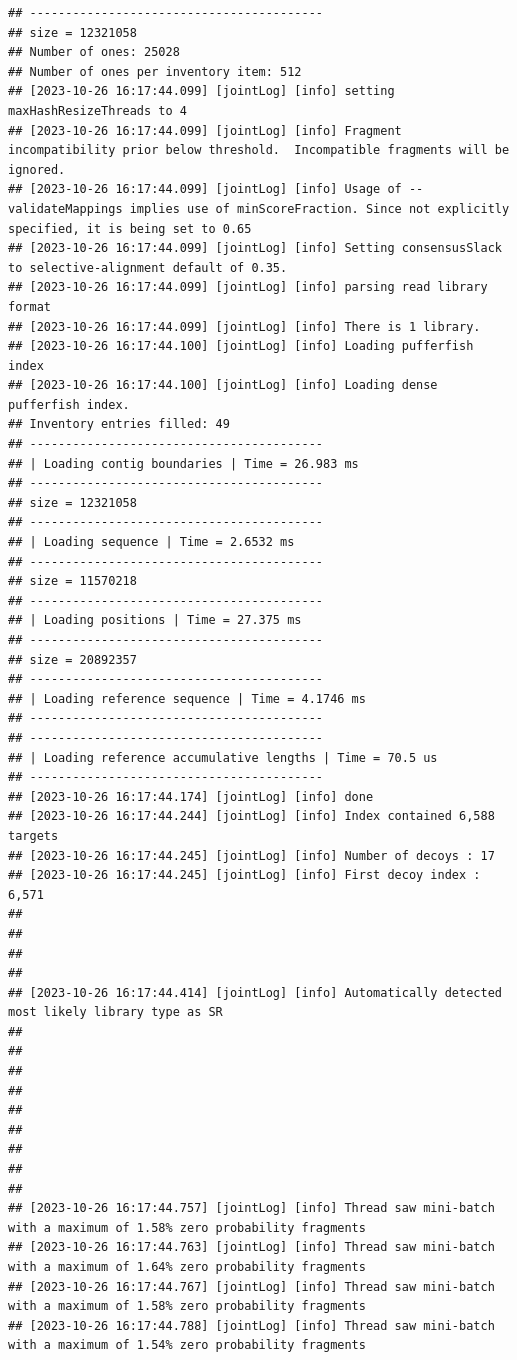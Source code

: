\documentclass[
]{book}
\begin{document}
\begin{verbatim}
## -----------------------------------------
## size = 12321058
## Number of ones: 25028
## Number of ones per inventory item: 512
## [2023-10-26 16:17:44.099] [jointLog] [info] setting maxHashResizeThreads to 4
## [2023-10-26 16:17:44.099] [jointLog] [info] Fragment incompatibility prior below threshold.  Incompatible fragments will be ignored.
## [2023-10-26 16:17:44.099] [jointLog] [info] Usage of --validateMappings implies use of minScoreFraction. Since not explicitly specified, it is being set to 0.65
## [2023-10-26 16:17:44.099] [jointLog] [info] Setting consensusSlack to selective-alignment default of 0.35.
## [2023-10-26 16:17:44.099] [jointLog] [info] parsing read library format
## [2023-10-26 16:17:44.099] [jointLog] [info] There is 1 library.
## [2023-10-26 16:17:44.100] [jointLog] [info] Loading pufferfish index
## [2023-10-26 16:17:44.100] [jointLog] [info] Loading dense pufferfish index.
## Inventory entries filled: 49
## -----------------------------------------
## | Loading contig boundaries | Time = 26.983 ms
## -----------------------------------------
## size = 12321058
## -----------------------------------------
## | Loading sequence | Time = 2.6532 ms
## -----------------------------------------
## size = 11570218
## -----------------------------------------
## | Loading positions | Time = 27.375 ms
## -----------------------------------------
## size = 20892357
## -----------------------------------------
## | Loading reference sequence | Time = 4.1746 ms
## -----------------------------------------
## -----------------------------------------
## | Loading reference accumulative lengths | Time = 70.5 us
## -----------------------------------------
## [2023-10-26 16:17:44.174] [jointLog] [info] done
## [2023-10-26 16:17:44.244] [jointLog] [info] Index contained 6,588 targets
## [2023-10-26 16:17:44.245] [jointLog] [info] Number of decoys : 17
## [2023-10-26 16:17:44.245] [jointLog] [info] First decoy index : 6,571 
## 
## 
## 
## 
## [2023-10-26 16:17:44.414] [jointLog] [info] Automatically detected most likely library type as SR
## 
## 
## 
## 
## 
## 
## 
## 
## 
## [2023-10-26 16:17:44.757] [jointLog] [info] Thread saw mini-batch with a maximum of 1.58% zero probability fragments
## [2023-10-26 16:17:44.763] [jointLog] [info] Thread saw mini-batch with a maximum of 1.64% zero probability fragments
## [2023-10-26 16:17:44.767] [jointLog] [info] Thread saw mini-batch with a maximum of 1.58% zero probability fragments
## [2023-10-26 16:17:44.788] [jointLog] [info] Thread saw mini-batch with a maximum of 1.54% zero probability fragments

\end{verbatim}
\end{document}
